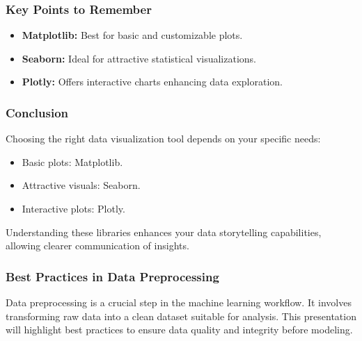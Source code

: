 \documentclass[aspectratio=169]{beamer}
\begin{document}
\begin{frame}
    \frametitle{Key Points to Remember}
    \begin{itemize}
        \item \textbf{Matplotlib:} Best for basic and customizable plots.
        \item \textbf{Seaborn:} Ideal for attractive statistical visualizations.
        \item \textbf{Plotly:} Offers interactive charts enhancing data exploration.
    \end{itemize}
\end{frame}

\begin{frame}
    \frametitle{Conclusion}
    Choosing the right data visualization tool depends on your specific needs:
    \begin{itemize}
        \item Basic plots: Matplotlib.
        \item Attractive visuals: Seaborn.
        \item Interactive plots: Plotly.
    \end{itemize}
    Understanding these libraries enhances your data storytelling capabilities, allowing clearer communication of insights.
\end{frame}

\begin{frame}[fragile]
    \frametitle{Best Practices in Data Preprocessing}
    Data preprocessing is a crucial step in the machine learning workflow. 
    It involves transforming raw data into a clean dataset suitable for analysis. 
    This presentation will highlight best practices to ensure data quality and integrity before modeling.
\end{frame}
\end{document}
